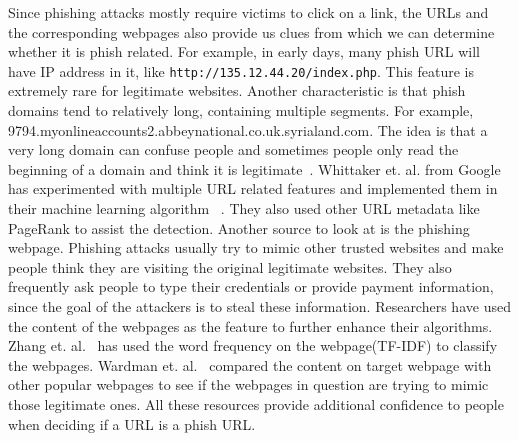 Since phishing attacks mostly require victims to click on a link, the URLs 
and the corresponding webpages also provide us clues from which we can 
determine whether it is phish related. For example, in early days, many
phish URL will have IP address in it, like \texttt{http://135.12.44.20/index.php}. This feature is extremely rare for
legitimate websites. Another characteristic is that phish domains tend to
relatively long, containing multiple segments. For example, 9794.myonlineaccounts2.abbeynational.co.uk.syrialand.com. The idea is that
a very long domain can confuse people and sometimes people only read the 
beginning of a domain and think it is legitimate~\cite{wu2006security}.
Whittaker et. al. from Google has experimented with multiple URL related
features and implemented them in their machine learning algorithm
~\cite{whittaker2010large}. They also used other URL metadata like PageRank
to assist the detection. Another source to look at is the phishing
webpage. Phishing attacks usually try to mimic other trusted websites and
make people think they are visiting the original legitimate websites. They
also frequently ask people to type their credentials or provide payment
information, since the goal of the attackers is to steal these information.
Researchers have used the content of the webpages as the feature to further
enhance their algorithms. Zhang et. al.~\cite{zhang2007cantina} has used 
the word frequency on the webpage(TF-IDF) to classify the webpages. Wardman 
et. al.~\cite{wardman2008automating} compared the content on target webpage
with other popular webpages to see if the webpages in question are trying
to mimic those legitimate ones. All these resources provide additional
confidence to people when deciding if a URL is a phish URL.